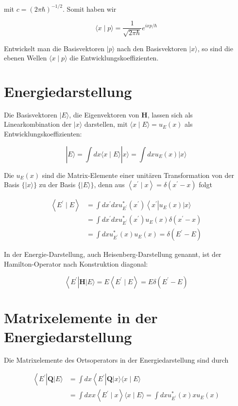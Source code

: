 \documentclass[10pt, letterpaper]{article}
\begin{document}
mit $c=(2 \pi \hbar)^{-1 / 2}$. Somit haben wir

$$
\langle x \mid p\rangle=\frac{1}{\sqrt{2 \pi \hbar}} e^{i x p / \hbar}
$$

Entwickelt man die Basisvektoren $|p\rangle$ nach den Basisvektoren $|x\rangle$, so sind die ebenen Wellen $\langle x \mid p\rangle$ die Entwicklungskoeffizienten.

\section*{Energiedarstellung}
Die Basisvektoren $|E\rangle$, die Eigenvektoren von $\mathbf{H}$, lassen sich als Linearkombination der $|x\rangle$ darstellen, mit $\langle x \mid E\rangle=u_{E}(x)$ als Entwicklungskoeffizienten:

$$
|E\rangle=\int d x\langle x \mid E\rangle|x\rangle=\int d x u_{E}(x)|x\rangle
$$

Die $u_{E}(x)$ sind die Matrix-Elemente einer unitären Transformation von der Basis $\{|x\rangle\}$ zu der Basis $\{|E\rangle\}$, denn aus $\left\langle x^{\prime} \mid x\right\rangle=\delta\left(x^{\prime}-x\right)$ folgt

$$
\begin{aligned}
\left\langle E^{\prime} \mid E\right\rangle & =\int d x^{\prime} d x u_{E^{\prime}}^{*}\left(x^{\prime}\right)\left\langle x^{\prime}\right| u_{E}(x)|x\rangle \\
& =\int d x^{\prime} d x u_{E^{\prime}}^{*}\left(x^{\prime}\right) u_{E}(x) \delta\left(x^{\prime}-x\right) \\
& =\int d x u_{E^{\prime}}^{*}(x) u_{E}(x)=\delta\left(E^{\prime}-E\right)
\end{aligned}
$$

In der Energie-Darstellung, auch Heisenberg-Darstellung genannt, ist der Hamilton-Operator nach Konstruktion diagonal:

$$
\left\langle E^{\prime}\right| \mathbf{H}|E\rangle=E\left\langle E^{\prime} \mid E\right\rangle=E \delta\left(E^{\prime}-E\right)
$$

\section*{Matrixelemente in der Energiedarstellung}
Die Matrixelemente des Ortsoperators in der Energiedarstellung sind durch

$$
\begin{aligned}
\left\langle E^{\prime}\right| \mathbf{Q}|E\rangle & =\int d x\left\langle E^{\prime}\right| \mathbf{Q}|x\rangle\langle x \mid E\rangle \\
& =\int d x x\left\langle E^{\prime} \mid x\right\rangle\langle x \mid E\rangle=\int d x u_{E^{\prime}}^{*}(x) x u_{E}(x)
\end{aligned}
$$
\end{document}

